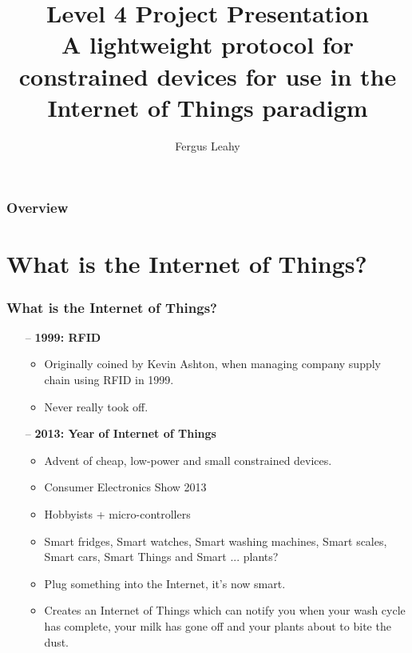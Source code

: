 \documentclass{beamer}
\title{Level 4 Project Presentation \\ A lightweight protocol for constrained devices for use in the Internet of
Things paradigm}
\author{Fergus Leahy}
\begin{document}
\maketitle


\begin{frame}
  \frametitle{Overview}
  \tableofcontents{}
\end{frame}


\section{What is the Internet of Things?} %
  \label{sec:introduction}
  \begin{frame}[t]\frametitle{What is the Internet of Things?}
    \begin{itemize}
      \item [--] \textbf{1999: RFID}
      \begin{itemize}
        \item Originally coined by Kevin Ashton, when managing company supply chain using RFID in 1999.
        \item Never really took off.
      \end{itemize}
    \end{itemize}
  	\begin{itemize}
      \item[--] \textbf{2013: Year of Internet of Things}
      \begin{itemize}
        \item Advent of cheap, low-power and small constrained devices.
        \item Consumer Electronics Show 2013
        \item Hobbyists + micro-controllers
        \item Smart fridges, Smart watches, Smart washing machines, Smart scales, Smart cars, Smart Things and Smart ... plants?
        \item Plug something into the Internet, it's now smart.
        \item Creates an Internet of Things which can notify you when your wash cycle has complete, your milk has gone off and your plants about to bite the dust.
      \end{itemize}
    \end{itemize}


\end{frame}
\end{document}
